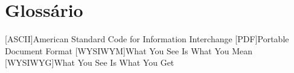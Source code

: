 \chapter{Glossário}

\begin{acronym}[wysiwygxxx]
[ASCII]{American Standard Code for Information Interchange}
[PDF]{Portable Document Format}
[WYSIWYM]{What You See Is What You Mean}
[WYSIWYG]{What You See Is What You Get}

\end{acronym}